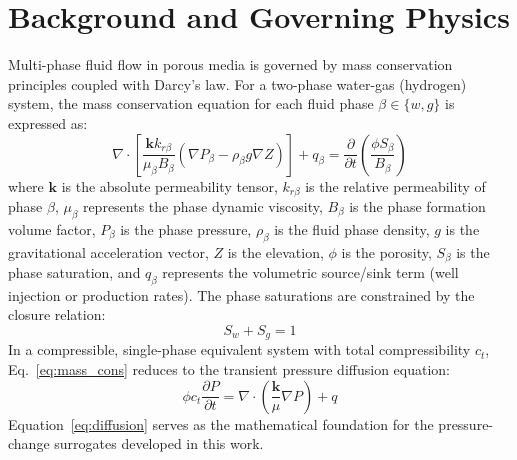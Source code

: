 \section{Background and Governing Physics}
Multi-phase fluid flow in porous media is governed by mass conservation principles coupled with Darcy's law. For a two-phase water-gas (hydrogen) system, the mass conservation equation for each fluid phase $\beta \in \{w, g\}$ is expressed as:
\begin{equation}
\label{eq:mass_cons}
\nabla \cdot \left[ \frac{\mathbf{k} k_{r\beta}}{\mu_\beta B_\beta} (\nabla P_\beta - \rho_\beta g \nabla Z) \right] + q_\beta = \frac{\partial}{\partial t} \left( \frac{\phi S_\beta}{B_\beta} \right)
\end{equation}
where $\mathbf{k}$ is the absolute permeability tensor, $k_{r\beta}$ is the relative permeability of phase $\beta$, $\mu_\beta$ represents the phase dynamic viscosity, $B_\beta$ is the phase formation volume factor, $P_\beta$ is the phase pressure, $\rho_\beta$ is the fluid phase density, $g$ is the gravitational acceleration vector, $Z$ is the elevation, $\phi$ is the porosity, $S_\beta$ is the phase saturation, and $q_\beta$ represents the volumetric source/sink term (well injection or production rates). The phase saturations are constrained by the closure relation:
\begin{equation}
\label{eq:saturation_constraint}
S_w + S_g = 1
\end{equation}
In a compressible, single-phase equivalent system with total compressibility $c_t$, Eq.~\ref{eq:mass_cons} reduces to the transient pressure diffusion equation:
\begin{equation}
\label{eq:diffusion}
\phi c_t \frac{\partial P}{\partial t} = \nabla \cdot \left( \frac{\mathbf{k}}{\mu} \nabla P \right) + q
\end{equation}
Equation~\ref{eq:diffusion} serves as the mathematical foundation for the pressure-change surrogates developed in this work.

